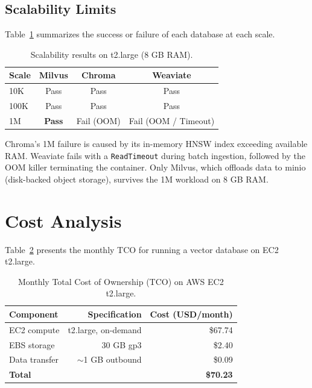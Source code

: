 \documentclass[12pt,a4paper]{article}
\begin{document}
\subsection{Scalability Limits}

Table~\ref{tab:scalability} summarizes the success or failure of each database at each scale.

\begin{table}[H]
\centering
\caption{Scalability results on t2.large (8 GB RAM).}
\label{tab:scalability}
\small
\begin{tabular}{lccc}
\toprule
\textbf{Scale} & \textbf{Milvus} & \textbf{Chroma} & \textbf{Weaviate} \\
\midrule
10K   & Pass & Pass & Pass \\
100K  & Pass & Pass & Pass \\
1M    & \textbf{Pass} & Fail (OOM) & Fail (OOM / Timeout) \\
\bottomrule
\end{tabular}
\end{table}

Chroma's 1M failure is caused by its in-memory HNSW index exceeding available RAM. Weaviate fails with a \texttt{ReadTimeout} during batch ingestion, followed by the OOM killer terminating the container. Only Milvus, which offloads data to minio (disk-backed object storage), survives the 1M workload on 8 GB RAM.

\section{Cost Analysis}

Table~\ref{tab:tco} presents the monthly TCO for running a vector database on EC2 t2.large.

\begin{table}[H]
\centering
\caption{Monthly Total Cost of Ownership (TCO) on AWS EC2 t2.large.}
\label{tab:tco}
\small
\begin{tabular}{lrr}
\toprule
\textbf{Component} & \textbf{Specification} & \textbf{Cost (USD/month)} \\
\midrule
EC2 compute & t2.large, on-demand & \$67.74 \\
EBS storage & 30 GB gp3 & \$2.40 \\
Data transfer & $\sim$1 GB outbound & \$0.09 \\
\midrule
\textbf{Total} & & \textbf{\$70.23} \\
\bottomrule
\end{tabular}
\end{table}
\end{document}
